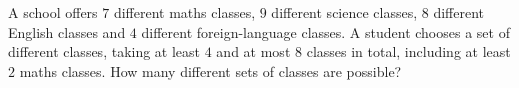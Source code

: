 A school offers $7$ different maths classes, $9$ different science classes, $8$ different English classes and $4$ different foreign-language classes. A student chooses a set of different classes, taking at least $4$ and at most $8$ classes in total, including at least $2$ maths classes. How many different sets of classes are possible?
